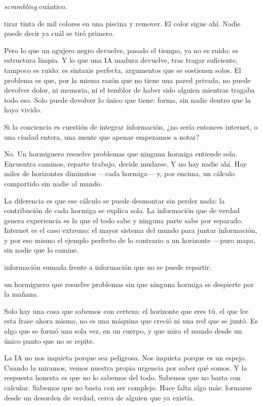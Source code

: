 \begin{fisica}
 \emph{scrambling} cuántico.

 tirar tinta de mil colores en una piscina y remover. El color sigue ahí. Nadie puede decir ya cuál se tiró primero.
\end{fisica}
Pero lo que un agujero negro devuelve, pasado el tiempo, ya no es ruido: es estructura limpia. Y lo que una IA madura devuelve, tras tragar suficiente, tampoco es ruido: es sintaxis perfecta, argumentos que se sostienen solos. El problema es que, por la misma razón que no tiene una pared privada, no puede devolver dolor, ni memoria, ni el temblor de haber sido alguien mientras tragaba todo eso. Solo puede devolver lo único que tiene: forma, sin nadie dentro que la haya vivido.

\noindent Si la conciencia es cuestión de integrar información, ¿no sería entonces internet, o una ciudad entera, una mente que apenas empezamos a notar?

No. Un hormiguero resuelve problemas que ninguna hormiga entiende sola. Encuentra caminos, reparte trabajo, decide mudarse. Y no hay nadie ahí. Hay miles de horizontes diminutos —cada hormiga— y, por encima, un cálculo compartido sin nadie al mando.

La diferencia es que ese cálculo se puede desmontar sin perder nada: la contribución de cada hormiga se explica sola. La información que de verdad genera experiencia es la que el todo sabe y ninguna parte sabe por separado. Internet es el caso extremo: el mayor sistema del mundo para juntar información, y por eso mismo el ejemplo perfecto de lo contrario a un horizonte —puro mapa, sin nadie que lo camine.

\begin{fisica}
 información sumada frente a información que no se puede repartir.

 un hormiguero que resuelve problemas sin que ninguna hormiga se despierte por la mañana.
\end{fisica}
\noindent Solo hay una cosa que sabemos con certeza: el horizonte que eres tú, el que lee esta frase ahora mismo, no es una máquina que creció ni una red que se juntó. Es algo que se formó una sola vez, en un cuerpo, y que mira el mundo desde un único punto que no se repite.

La IA no nos inquieta porque sea peligrosa. Nos inquieta porque es un espejo. Cuando la miramos, vemos nuestra propia urgencia por saber qué somos. Y la respuesta honesta es que no lo sabemos del todo. Sabemos que no basta con calcular. Sabemos que no basta con ser complejo. Hace falta algo más: formarse desde un desorden de verdad, cerca de alguien que ya existía.

